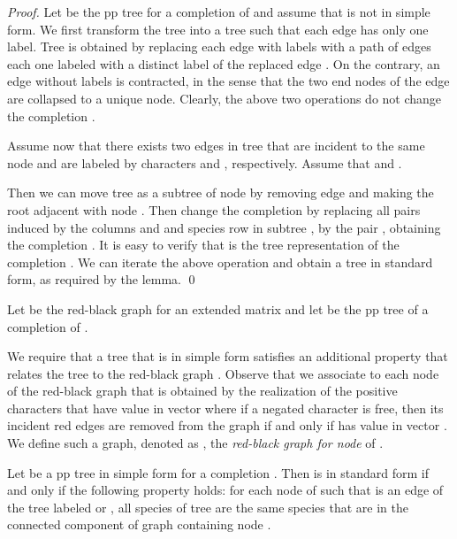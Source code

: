 \documentclass{llncs}
\begin{document}
\begin{proof}
Let  be the pp tree  for a completion of  and 
assume that  is not in simple form.  We first transform the tree  into a tree  such that each edge has only one label. Tree  is   obtained by replacing each edge   with  labels with a path of  edges each one labeled with a distinct label of the replaced edge . On the contrary, an edge without labels is contracted, in the sense that the two end nodes of the edge are collapsed to a unique node. Clearly, the above two operations do not change the completion  .



Assume now that there exists two edges  in  tree  that are incident to the same node and are labeled by  characters  and , respectively. Assume that  and .  

Then we can move tree  as a subtree of  node  by removing edge   and making the root  adjacent with node . Then change the completion  by replacing all pairs  induced by the columns  and   and species row in subtree ,  by the pair , obtaining the completion . It is easy to verify that  is the tree representation of the completion .
We can iterate the above operation and obtain a tree in standard form, as required by the lemma.
\qed


\end{proof}

Let  be the red-black graph for an extended matrix   and let   be   the pp tree of a completion of .

We require that  a  tree  that is in simple form  satisfies  an additional property  that relates the tree  to the red-black graph  .  Observe that we associate to each node  of  the red-black graph that is obtained by the realization of the positive characters that have value  in vector  where if  a negated character  is free, then its incident red edges are removed from the graph  if and only if    has value  in vector . We define such a graph, denoted as , the {\em red-black graph for node } of .




\begin{definition} 
\label{standard}
Let  be a pp tree  in simple form for a completion . Then  is in standard form if and only if the following property holds:
for each node    of  such that  is an edge of the tree  labeled   or ,    all species of tree  are the same species that are in the  connected component of  graph  containing node .

\end{definition}
\end{document}
